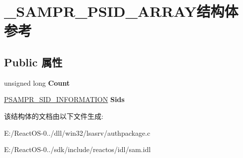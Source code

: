 \hypertarget{struct___s_a_m_p_r___p_s_i_d___a_r_r_a_y}{}\section{\+\_\+\+S\+A\+M\+P\+R\+\_\+\+P\+S\+I\+D\+\_\+\+A\+R\+R\+A\+Y结构体 参考}
\label{struct___s_a_m_p_r___p_s_i_d___a_r_r_a_y}
\subsection*{Public 属性}
\begin{DoxyCompactItemize}
\item 
\mbox{\label{struct___s_a_m_p_r___p_s_i_d___a_r_r_a_y_a68cbe48205bb720027784d4927c2a9ff}} 
unsigned long {\bfseries Count}
\item 
\mbox{\label{struct___s_a_m_p_r___p_s_i_d___a_r_r_a_y_ab36388d2d2b02ff37a3fab67336e731e}} 
\hyperlink{struct___s_a_m_p_r___s_i_d___i_n_f_o_r_m_a_t_i_o_n}{P\+S\+A\+M\+P\+R\+\_\+\+S\+I\+D\+\_\+\+I\+N\+F\+O\+R\+M\+A\+T\+I\+ON} {\bfseries Sids}
\end{DoxyCompactItemize}


该结构体的文档由以下文件生成\+:\begin{DoxyCompactItemize}
\item 
E\+:/\+React\+O\+S-\/0../dll/win32/lsasrv/authpackage.\+c\item 
E\+:/\+React\+O\+S-\/0../sdk/include/reactos/idl/sam.\+idl\end{DoxyCompactItemize}

